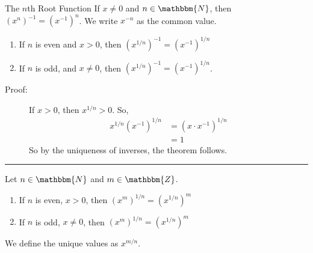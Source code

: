 \documentclass[10pt]{extarticle}
\newcommand{\N}{\mathbbm{N}}
\newcommand{\Z}{\mathbbm{Z}}
\begin{document}
\begin{problem}{The $n$th Root Function}
    If $x\neq 0$ and $n\in\N$, then $\left(x^n\right)^{-1} = (x^{-1})^n$. We write $x^{-n}$ as the common value.\\

    
    \begin{enumerate}[(1)]
      \item If $n$ is even and $x > 0$, then $\left(x^{1/n}\right)^{-1} = \left(x^{-1}\right)^{1/n}$ 
      \item If $n$ is odd, and $x\neq 0$, then $\left(x^{1/n}\right)^{-1} = \left(x^{-1}\right)^{1/n}$.
    \end{enumerate}
    \begin{description}
      \item[Proof:] If $x > 0$, then $x^{1/n} > 0$. So,
        \begin{align*}
          x^{1/n} \left(x^{-1}\right)^{1/n} &= (x\cdot x^{-1})^{1/n}\\
                                            &= 1
        \end{align*}
        So by the uniqueness of inverses, the theorem follows.
    \end{description}
    \vspace{4pt}
    \rule{\textwidth}{0.4pt}
    \vspace{4pt}
    Let $n\in\N$ and $m\in\Z$.
    \begin{enumerate}[(1)]
      \item If $n$ is even, $x > 0$, then $\left(x^m\right)^{1/n}=\left(x^{1/n}\right)^m $
      \item If $n$ is odd, $x\neq 0$, then $\left(x^{m}\right)^{1/n} = \left(x^{1/n}\right)^m$
    \end{enumerate}
    We define the unique values as $x^{m/n}$.
  \end{problem}
\end{document}
